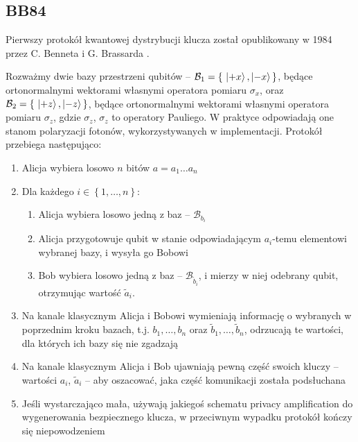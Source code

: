 \documentclass[10pt]{article}
\begin{document}

\subsection{BB84}

Pierwszy \cite{Scarani09} protokół kwantowej dystrybucji klucza został opublikowany w 1984 przez
C. Benneta i G. Brassarda \cite{bb84}. 

Rozważmy dwie bazy przestrzeni qubitów -- \(\mathcal{B}_1 = \left\{\ \Ket{+x}, \Ket{-x}\,\right\}\), 
będące ortonormalnymi wektorami własnymi operatora pomiaru \(\sigma_x\), oraz 
\(\mathcal{B}_2 = \left\{\ \Ket{+z}, \Ket{-z}\,\right\}\), będące ortonormalnymi wektorami własnymi
operatora pomiaru \(\sigma_z\), gdzie \(\sigma_z\), \(\sigma_z\) to operatory Pauliego. W praktyce
odpowiadają one stanom polaryzacji fotonów, wykorzystywanych w implementacji. Protokół przebiega 
następująco:

\begin{enumerate}
  \item Alicja wybiera losowo \(n\) bitów \(a=a_1\ldots a_n\)
  \item Dla każdego \(i\in\left\{1,\ldots,n\right\}\):
    \begin{enumerate}
      \item Alicja wybiera losowo jedną z baz -- \(\mathcal{B}_{b_i}\)
      \item Alicja przygotowuje qubit w stanie odpowiadającym \(a_i\)-temu elementowi wybranej
        bazy, i wysyła go Bobowi
      \item Bob wybiera losowo jedną z baz -- \(\mathcal{B}_{\tilde{b}_i}\), i mierzy w niej
        odebrany qubit, otrzymując wartość \(\tilde{a}_i\).
    \end{enumerate}
  \item Na kanale klasycznym Alicja i Bobowi wymieniają informację o wybranych w poprzednim
    kroku bazach, t.j. \(b_1,\ldots,b_n\) oraz \(\tilde{b}_1,\ldots,\tilde{b}_n\), odrzucają te
    wartości, dla których ich bazy się nie zgadzają
  \item Na kanale klasycznym Alicja i Bob ujawniają pewną część swoich kluczy -- wartości 
    \(a_i\), \(\tilde{a}_i\) -- aby oszacować, jaka część komunikacji została podsłuchana
  \item Jeśli wystarczająco mała, używają jakiegoś schematu privacy amplification do wygenerowania
    bezpiecznego klucza, w przeciwnym wypadku protokół kończy się niepowodzeniem
\end{enumerate}
\end{document}
